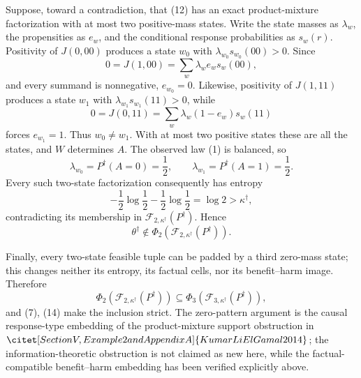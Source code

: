 Suppose, toward a contradiction, that (12) has an exact product-mixture factorization with at most two positive-mass states. Write the state masses as \(\lambda_w\), the propensities as \(e_w\), and the conditional response probabilities as \(s_w(r)\). Positivity of \(J(0,00)\) produces a state \(w_0\) with \(\lambda_{w_0}s_{w_0}(00)>0\). Since
\[
0=J(1,00)=\sum_w\lambda_w e_w s_w(00),
\]
and every summand is nonnegative, \(e_{w_0}=0\). Likewise, positivity of \(J(1,11)\) produces a state \(w_1\) with \(\lambda_{w_1}s_{w_1}(11)>0\), while
\[
0=J(0,11)=\sum_w\lambda_w(1-e_w)s_w(11)
\]
forces \(e_{w_1}=1\). Thus \(w_0\neq w_1\). With at most two positive states these are all the states, and \(W\) determines \(A\). The observed law (1) is balanced, so
\[
\lambda_{w_0}=P^\dagger(A=0)=\frac12,
\qquad
\lambda_{w_1}=P^\dagger(A=1)=\frac12.
\]
Every such two-state factorization consequently has entropy
\[
-\frac12\log\frac12-\frac12\log\frac12=\log2
>\kappa^\dagger,
\tag{13}
\]
contradicting its membership in \(\mathcal F_{2,\kappa^\dagger}(P^\dagger)\). Hence
\[
\theta^\dagger\notin
\Phi_2(\mathcal F_{2,\kappa^\dagger}(P^\dagger)).
\tag{14}
\]

Finally, every two-state feasible tuple can be padded by a third zero-mass state; this changes neither its entropy, its factual cells, nor its benefit--harm image. Therefore
\[
\Phi_2(\mathcal F_{2,\kappa^\dagger}(P^\dagger))
\subseteq
\Phi_3(\mathcal F_{3,\kappa^\dagger}(P^\dagger)),
\]
and (7), (14) make the inclusion strict. The zero-pattern argument is the causal response-type embedding of the product-mixture support obstruction in \(\citet[Section V, Example 2 and Appendix A]{KumarLiElGamal2014}\); the information-theoretic obstruction is not claimed as new here, while the factual-compatible benefit--harm embedding has been verified explicitly above.